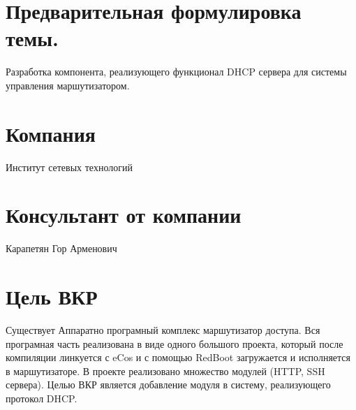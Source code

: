 \documentclass[12pt]{article}
\begin{document}

\section{Предварительная формулировка темы.}
Разработка компонента, реализующего функционал DHCP сервера для системы управления маршутизатором.

\section{Компания}
Институт сетевых технологий

\section{Консультант от компании}
Карапетян Гор Арменович

\section{Цель ВКР}
Существует Аппаратно програмный комплекс маршутизатор доступа. Вся програмная часть реализована в виде одного большого проекта, который после компиляции линкуется с eCos и с помощью RedBoot загружается и исполняется в маршутизаторе. В проекте реализовано множество модулей (HTTP, SSH сервера). Целью ВКР является добавление модуля в систему, реализующего протокол DHCP.

\end{document}
